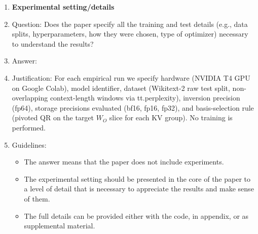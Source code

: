 \begin{enumerate}
\item {\bf Experimental setting/details}
    \item[] Question: Does the paper specify all the training and test details (e.g., data splits, hyperparameters, how they were chosen, type of optimizer) necessary to understand the results?
    \item[] Answer: \answerYes{} %
    \item[] Justification: For each empirical run we specify hardware (NVIDIA T4 GPU on Google Colab), model identifier, dataset (Wikitext-2 raw test split, non-overlapping context-length windows via tt.perplexity), inversion precision (fp64), storage precisions evaluated (bf16, fp16, fp32), and basis-selection rule (pivoted QR on the target $W_O$ slice for each KV group). No training is performed.
    \item[] Guidelines:
    \begin{itemize}
        \item The answer \answerNA{} means that the paper does not include experiments.
        \item The experimental setting should be presented in the core of the paper to a level of detail that is necessary to appreciate the results and make sense of them.
        \item The full details can be provided either with the code, in appendix, or as supplemental material.
    \end{itemize}


\end{enumerate}
